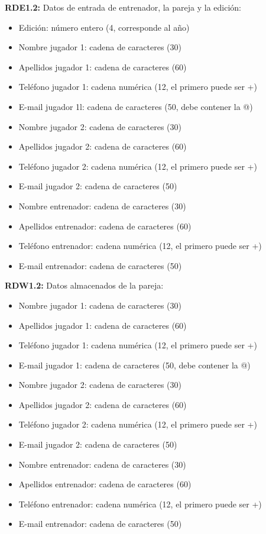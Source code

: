 \textbf{RDE1.2:} Datos de entrada de entrenador, la pareja y la edición:
\begin{itemize}
	\item Edición: número entero (4, corresponde al año)
\newline
	\item Nombre jugador 1: cadena de caracteres (30)
	\item Apellidos jugador 1: cadena de caracteres (60)
	\item Teléfono jugador 1: cadena numérica (12, el primero puede ser +)
	\item E-mail jugador 1l: cadena de caracteres (50, debe contener la @)
\newline
	\item Nombre jugador 2: cadena de caracteres (30)
	\item Apellidos jugador 2: cadena de caracteres (60)
	\item Teléfono jugador 2: cadena numérica (12, el primero puede ser +)
	\item E-mail jugador 2: cadena de caracteres (50)
\newline
	\item Nombre entrenador: cadena de caracteres (30)
	\item Apellidos entrenador: cadena de caracteres (60)
	\item Teléfono entrenador: cadena numérica (12, el primero puede ser +)
	\item E-mail entrenador: cadena de caracteres (50)
\end{itemize}

\textbf{RDW1.2:} Datos almacenados de la pareja:
\begin{itemize}
	\item Nombre jugador 1: cadena de caracteres (30)
	\item Apellidos jugador 1: cadena de caracteres (60)
	\item Teléfono jugador 1: cadena numérica (12, el primero puede ser +)
	\item E-mail jugador 1: cadena de caracteres (50, debe contener la @)
\newline
	\item Nombre jugador 2: cadena de caracteres (30)
	\item Apellidos jugador 2: cadena de caracteres (60)
	\item Teléfono jugador 2: cadena numérica (12, el primero puede ser  +)
	\item E-mail jugador 2: cadena de caracteres (50)
\newline
	\item Nombre entrenador: cadena de caracteres (30)
	\item Apellidos entrenador: cadena de caracteres (60)
	\item Teléfono entrenador: cadena numérica (12, el primero puede ser +)
	\item E-mail entrenador: cadena de caracteres (50)
\end{itemize}

